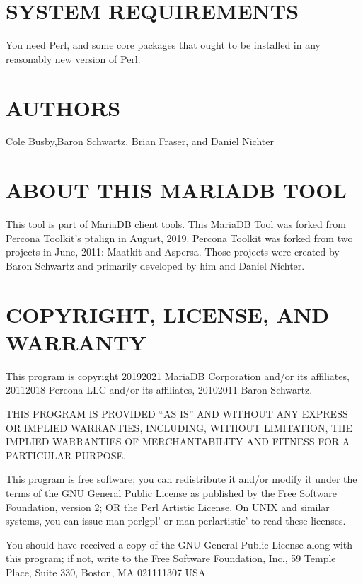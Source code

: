\documentclass[letterpaper,10pt,english]{sphinxmanual}
\begin{document}
\section{SYSTEM REQUIREMENTS}
\label{\detokenize{mariadb-align-output:system-requirements}}
You need Perl, and some core packages that ought to be installed in any
reasonably new version of Perl.


\section{AUTHORS}
\label{\detokenize{mariadb-align-output:authors}}
Cole Busby,Baron Schwartz, Brian Fraser, and Daniel Nichter


\section{ABOUT THIS MARIADB TOOL}
\label{\detokenize{mariadb-align-output:about-this-mariadb-tool}}
This tool is part of MariaDB client tools. This MariaDB Tool was forked from
Percona Toolkit’s pt\sphinxhyphen{}align in August, 2019. Percona Toolkit was forked from two
projects in June, 2011: Maatkit and Aspersa.  Those projects were created by
Baron Schwartz and primarily developed by him and Daniel Nichter.


\section{COPYRIGHT, LICENSE, AND WARRANTY}
\label{\detokenize{mariadb-align-output:copyright-license-and-warranty}}
This program is copyright 2019\sphinxhyphen{}2021 MariaDB Corporation and/or its affiliates,
2011\sphinxhyphen{}2018 Percona LLC and/or its affiliates, 2010\sphinxhyphen{}2011 Baron Schwartz.

THIS PROGRAM IS PROVIDED “AS IS” AND WITHOUT ANY EXPRESS OR IMPLIED
WARRANTIES, INCLUDING, WITHOUT LIMITATION, THE IMPLIED WARRANTIES OF
MERCHANTABILITY AND FITNESS FOR A PARTICULAR PURPOSE.

This program is free software; you can redistribute it and/or modify it under
the terms of the GNU General Public License as published by the Free Software
Foundation, version 2; OR the Perl Artistic License.  On UNIX and similar
systems, you can issue \textasciigrave{}man perlgpl’ or \textasciigrave{}man perlartistic’ to read these
licenses.

You should have received a copy of the GNU General Public License along with
this program; if not, write to the Free Software Foundation, Inc., 59 Temple
Place, Suite 330, Boston, MA  02111\sphinxhyphen{}1307  USA.
\end{document}
